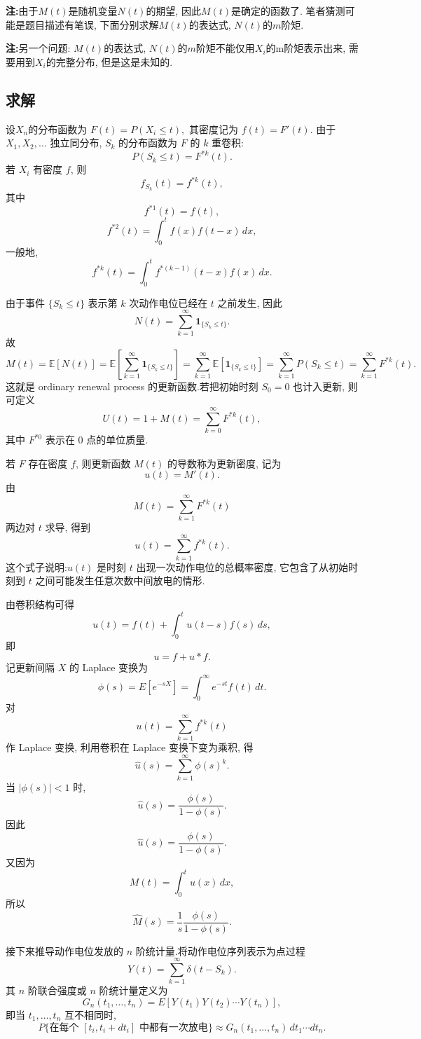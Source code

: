 ﻿\documentclass[UTF8,  zihao=-4]{ctexart}
\begin{document}
\textbf{注:}由于$M(t)$是随机变量$N(t)$的期望,  因此$M(t)$是确定的函数了. 笔者猜测可能是题目描述有笔误,  下面分别求解$M(t)$的表达式, $N(t)$的$m$阶矩.

\textbf{注:}另一个问题: $M(t)$的表达式, $N(t)$的$m$阶矩不能仅用$X_i$的m阶矩表示出来,  需要用到$X_i$的完整分布,  但是这是未知的.
\subsection{求解}
设$X_n$的分布函数为
$
F(t)=P(X_i\leq t),  
$
其密度记为
$
f(t)=F'(t).
$
由于 $X_1,  X_2,  \ldots$ 独立同分布,  $S_k$ 的分布函数为 $F$ 的 $k$ 重卷积:
\[
P(S_k\leq t)=F^{*k}(t).
\]
若 $X_i$ 有密度 $f$,  则
\[
f_{S_k}(t)=f^{*k}(t),  
\]
其中
\[
f^{*1}(t)=f(t),  
\]
\[
f^{*2}(t)=\int_0^t f(x)f(t-x)\,  dx,  
\]
一般地,  
\[
f^{*k}(t)
=
\int_0^t f^{*(k-1)}(t-x)f(x)\,  dx.
\]


由于事件 $\{S_k\leq t\}$ 表示第 $k$ 次动作电位已经在 $t$ 之前发生,  因此
\[
N(t)=\sum_{k=1}^{\infty}\mathbf 1_{\{S_k\leq t\}}.
\]
故
\[
M(t)
=\mathbb{E}[N(t)]
=\mathbb{E}\left[
\sum_{k=1}^{\infty}\mathbf 1_{\{S_k\leq t\}}
\right]
=\sum_{k=1}^{\infty}
\mathbb{E}\left[
\mathbf 1_{\{S_k\leq t\}}
\right]
=\sum_{k=1}^{\infty}
P(S_k\leq t)
=
\sum_{k=1}^{\infty}F^{*k}(t).
\]
这就是 ordinary renewal process 的更新函数.若把初始时刻 $S_0=0$ 也计入更新,  则可定义
\[
U(t)=1+M(t)=\sum_{k=0}^{\infty}F^{*k}(t),  
\]
其中 $F^{*0}$ 表示在 $0$ 点的单位质量.

若 $F$ 存在密度 $f$,  则更新函数 $M(t)$ 的导数称为更新密度,  记为
\[
u(t)=M'(t).
\]
由
\[
M(t)=\sum_{k=1}^{\infty}F^{*k}(t)
\]
两边对 $t$ 求导,  得到
\[
u(t)=\sum_{k=1}^{\infty}f^{*k}(t)
.
\]
这个式子说明:$u(t)$ 是时刻 $t$ 出现一次动作电位的总概率密度,  它包含了从初始时刻到 $t$ 之间可能发生任意次数中间放电的情形.

由卷积结构可得
\[
u(t)
=
f(t)+\int_0^t u(t-s)f(s)\,  ds,  
\]
即
\[
u=f+u*f
.
\]
记更新间隔 $X$ 的 Laplace 变换为
\[
\phi(s)=E[e^{-sX}]
=
\int_0^\infty e^{-st}f(t)\,  dt.
\]
对
\[
u(t)=\sum_{k=1}^{\infty}f^{*k}(t)
\]
作 Laplace 变换,  利用卷积在 Laplace 变换下变为乘积,  得
\[
\widehat u(s)
=
\sum_{k=1}^{\infty}\phi(s)^k.
\]
当 $|\phi(s)|<1$ 时,  
\[
\widehat u(s)
=
\frac{\phi(s)}{1-\phi(s)}.
\]
因此
\[
\widehat u(s)=\frac{\phi(s)}{1-\phi(s)}
.
\]
又因为
\[
M(t)=\int_0^t u(x)\,  dx,  
\]
所以
\[
\widehat M(s)
=
\frac{1}{s}\frac{\phi(s)}{1-\phi(s)}
.
\]

接下来推导动作电位发放的 $n$ 阶统计量.将动作电位序列表示为点过程
\[
Y(t)=\sum_{k=1}^{\infty}\delta(t-S_k).
\]
其 $n$ 阶联合强度或 $n$ 阶统计量定义为
\[
G_n(t_1,  \ldots,  t_n)
=
E\left[
Y(t_1)Y(t_2)\cdots Y(t_n)
\right],  
\]
即当 $t_1,  \ldots,  t_n$ 互不相同时,  
\[
P\{\text{在每个 }[t_i,  t_i+dt_i]\text{ 中都有一次放电}\}
\approx
G_n(t_1,  \ldots,  t_n)\,  dt_1\cdots dt_n.
\]
\end{document}
